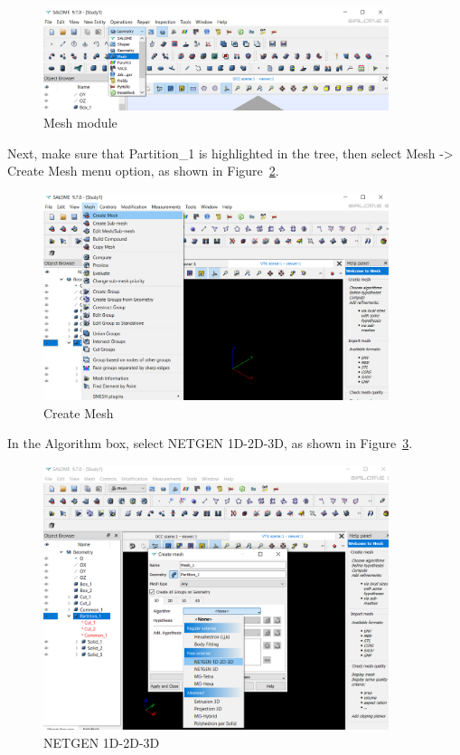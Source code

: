 \begin{figure}[H]
\centering
\includegraphics[width=0.9\textwidth]{Salome-17}
\caption{Mesh module}\label{fg:salome-17}
\end{figure}

Next, make sure that Partition\_1 is highlighted in the tree, then select Mesh -> Create Mesh menu option, as shown in Figure~\ref{fg:salome-18}.

\begin{figure}[H]
\centering
\includegraphics[width=0.9\textwidth]{Salome-18}
\caption{Create Mesh}\label{fg:salome-18}
\end{figure}

In the Algorithm box, select NETGEN 1D-2D-3D, as shown in Figure~\ref{fg:salome-19}.

\begin{figure}[H]
\centering
\includegraphics[width=0.9\textwidth]{Salome-19}
\caption{NETGEN 1D-2D-3D}\label{fg:salome-19}
\end{figure}

